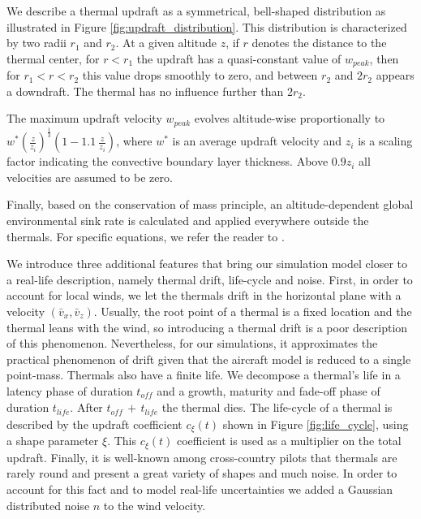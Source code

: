 \documentclass[a4paper, 10pt, conference]{ieeeconf}
\begin{document}

We describe a thermal updraft as a symmetrical, bell-shaped distribution as illustrated in Figure \ref{fig:updraft_distribution}. This distribution is characterized by two radii $r_1$ and $r_2$. At a given altitude $z$, if $r$ denotes the distance to the thermal center, for $r<r_1$ the updraft has a quasi-constant value of $w_{peak}$, then for $r_1<r<r_2$ this value drops smoothly to zero, and between $r_2$ and $2r_2$ appears a downdraft. The thermal has no influence further than $2r_2$.

The maximum updraft velocity $w_{peak}$ evolves altitude-wise proportionally to $w^* \left( \frac{z}{z_i} \right)^{\frac{1}{3}} \left(1 - 1.1 \ \frac{z}{z_i}\right)$, where $w^*$ is an average updraft velocity and $z_i$ is a scaling factor indicating the convective boundary layer thickness.
Above $0.9z_i$ all velocities are assumed to be zero.

Finally, based on the conservation of mass principle, an altitude-dependent global environmental sink rate is calculated and applied everywhere outside the thermals. For specific equations, we refer the reader to \cite{allen_thermal}.

We introduce three additional features that bring our simulation model closer to a real-life description, namely thermal drift, life-cycle and noise.
First, in order to account for local winds, we let the thermals drift in the horizontal plane with a velocity $(\bar{v}_x, \bar{v}_z)$. Usually, the root point of a thermal is a fixed location and the thermal leans with the wind, so introducing a thermal drift is a poor description of this phenomenon. Nevertheless, for our simulations, it approximates the practical phenomenon of drift given that the aircraft model is reduced to a single point-mass.
Thermals also have a finite life. We decompose a thermal's life in a latency phase of duration $t_{\textit{off}}$ and a growth, maturity and fade-off phase of duration $t_{\textit{life}}$. After $t_{\textit{off}} \, + \, t_{\textit{life}}$ the thermal dies. The life-cycle of a thermal is described by the updraft coefficient $c_\xi(t)$ shown in Figure \ref{fig:life_cycle}, using a shape parameter $\xi$. This $c_\xi(t)$ coefficient is used as a multiplier on the total updraft.
Finally, it is well-known among cross-country pilots that thermals are rarely round and present a great variety of shapes and much noise. In order to account for this fact and to model real-life uncertainties we added a Gaussian distributed noise $n$ to the wind velocity.
\end{document}
